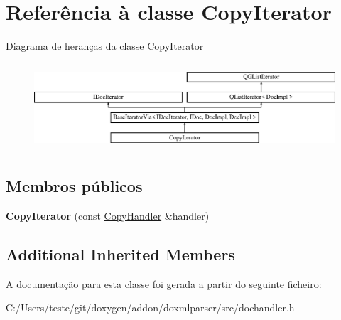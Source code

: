 \hypertarget{class_copy_iterator}{\section{Referência à classe Copy\-Iterator}
\label{class_copy_iterator}
}
Diagrama de heranças da classe Copy\-Iterator\begin{figure}[H]
\begin{center}
\leavevmode
\includegraphics[height=3.294118cm]{class_copy_iterator}
\end{center}
\end{figure}
\subsection*{Membros públicos}
\begin{DoxyCompactItemize}
\item 
\hypertarget{class_copy_iterator_a4227a43f629add727f8d0a35ead81dcf}{{\bfseries Copy\-Iterator} (const \hyperlink{class_copy_handler}{Copy\-Handler} \&handler)}\label{class_copy_iterator_a4227a43f629add727f8d0a35ead81dcf}

\end{DoxyCompactItemize}
\subsection*{Additional Inherited Members}


A documentação para esta classe foi gerada a partir do seguinte ficheiro\-:\begin{DoxyCompactItemize}
\item 
C\-:/\-Users/teste/git/doxygen/addon/doxmlparser/src/dochandler.\-h\end{DoxyCompactItemize}
